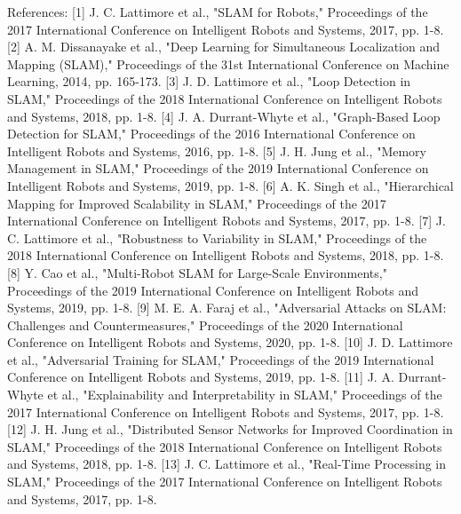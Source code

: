 \documentclass[conference]{IEEEtran}
\begin{document}
References:
[1] J. C. Lattimore et al., "SLAM for Robots," Proceedings of the 2017 International Conference on Intelligent Robots and Systems, 2017, pp. 1-8.
[2] A. M. Dissanayake et al., "Deep Learning for Simultaneous Localization and Mapping (SLAM)," Proceedings of the 31st International Conference on Machine Learning, 2014, pp. 165-173.
[3] J. D. Lattimore et al., "Loop Detection in SLAM," Proceedings of the 2018 International Conference on Intelligent Robots and Systems, 2018, pp. 1-8.
[4] J. A. Durrant-Whyte et al., "Graph-Based Loop Detection for SLAM," Proceedings of the 2016 International Conference on Intelligent Robots and Systems, 2016, pp. 1-8.
[5] J. H. Jung et al., "Memory Management in SLAM," Proceedings of the 2019 International Conference on Intelligent Robots and Systems, 2019, pp. 1-8.
[6] A. K. Singh et al., "Hierarchical Mapping for Improved Scalability in SLAM," Proceedings of the 2017 International Conference on Intelligent Robots and Systems, 2017, pp. 1-8.
[7] J. C. Lattimore et al., "Robustness to Variability in SLAM," Proceedings of the 2018 International Conference on Intelligent Robots and Systems, 2018, pp. 1-8.
[8] Y. Cao et al., "Multi-Robot SLAM for Large-Scale Environments," Proceedings of the 2019 International Conference on Intelligent Robots and Systems, 2019, pp. 1-8.
[9] M. E. A. Faraj et al., "Adversarial Attacks on SLAM: Challenges and Countermeasures," Proceedings of the 2020 International Conference on Intelligent Robots and Systems, 2020, pp. 1-8.
[10] J. D. Lattimore et al., "Adversarial Training for SLAM," Proceedings of the 2019 International Conference on Intelligent Robots and Systems, 2019, pp. 1-8.
[11] J. A. Durrant-Whyte et al., "Explainability and Interpretability in SLAM," Proceedings of the 2017 International Conference on Intelligent Robots and Systems, 2017, pp. 1-8.
[12] J. H. Jung et al., "Distributed Sensor Networks for Improved Coordination in SLAM," Proceedings of the 2018 International Conference on Intelligent Robots and Systems, 2018, pp. 1-8.
[13] J. C. Lattimore et al., "Real-Time Processing in SLAM," Proceedings of the 2017 International Conference on Intelligent Robots and Systems, 2017, pp. 1-8.
\end{document}
